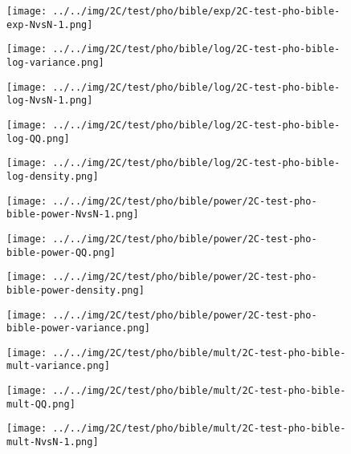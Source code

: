 \begin{figure}[H]
\centering	\texttt{[image: ../../img/2C/test/pho/bible/exp/2C-test-pho-bible-exp-NvsN-1.png]}
\end{figure}
\begin{figure}[H]
\centering	\texttt{[image: ../../img/2C/test/pho/bible/log/2C-test-pho-bible-log-variance.png]}
\end{figure}
\begin{figure}[H]
\centering	\texttt{[image: ../../img/2C/test/pho/bible/log/2C-test-pho-bible-log-NvsN-1.png]}
\end{figure}
\begin{figure}[H]
\centering	\texttt{[image: ../../img/2C/test/pho/bible/log/2C-test-pho-bible-log-QQ.png]}
\end{figure}
\begin{figure}[H]
\centering	\texttt{[image: ../../img/2C/test/pho/bible/log/2C-test-pho-bible-log-density.png]}
\end{figure}
\begin{figure}[H]
\centering	\texttt{[image: ../../img/2C/test/pho/bible/power/2C-test-pho-bible-power-NvsN-1.png]}
\end{figure}
\begin{figure}[H]
\centering	\texttt{[image: ../../img/2C/test/pho/bible/power/2C-test-pho-bible-power-QQ.png]}
\end{figure}
\begin{figure}[H]
\centering	\texttt{[image: ../../img/2C/test/pho/bible/power/2C-test-pho-bible-power-density.png]}
\end{figure}
\begin{figure}[H]
\centering	\texttt{[image: ../../img/2C/test/pho/bible/power/2C-test-pho-bible-power-variance.png]}
\end{figure}
\begin{figure}[H]
\centering	\texttt{[image: ../../img/2C/test/pho/bible/mult/2C-test-pho-bible-mult-variance.png]}
\end{figure}
\begin{figure}[H]
\centering	\texttt{[image: ../../img/2C/test/pho/bible/mult/2C-test-pho-bible-mult-QQ.png]}
\end{figure}
\begin{figure}[H]
\centering	\texttt{[image: ../../img/2C/test/pho/bible/mult/2C-test-pho-bible-mult-NvsN-1.png]}
\end{figure}
